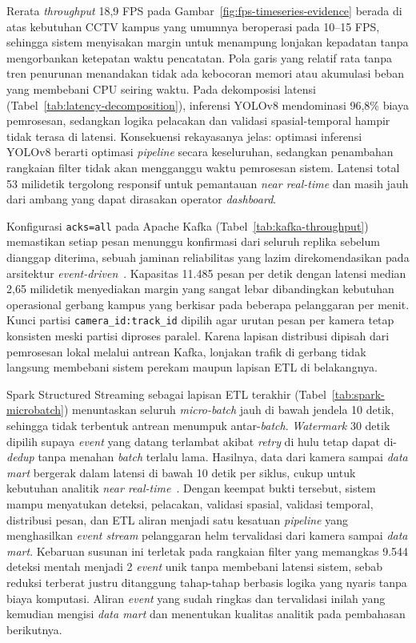 Rerata \textit{throughput} 18,9 FPS pada Gambar~\ref{fig:fps-timeseries-evidence} berada di atas kebutuhan CCTV kampus yang umumnya beroperasi pada 10--15 FPS, sehingga sistem menyisakan margin untuk menampung lonjakan kepadatan tanpa mengorbankan ketepatan waktu pencatatan. Pola garis yang relatif rata tanpa tren penurunan menandakan tidak ada kebocoran memori atau akumulasi beban yang membebani CPU seiring waktu. Pada dekomposisi latensi (Tabel~\ref{tab:latency-decomposition}), inferensi YOLOv8 mendominasi 96,8\% biaya pemrosesan, sedangkan logika pelacakan dan validasi spasial-temporal hampir tidak terasa di latensi. Konsekuensi rekayasanya jelas: optimasi inferensi YOLOv8 berarti optimasi \textit{pipeline} secara keseluruhan, sedangkan penambahan rangkaian filter tidak akan mengganggu waktu pemrosesan sistem. Latensi total 53 milidetik tergolong responsif untuk pemantauan \textit{near real-time} dan masih jauh dari ambang yang dapat dirasakan operator \textit{dashboard}.

Konfigurasi \texttt{acks=all} pada Apache Kafka (Tabel~\ref{tab:kafka-throughput}) memastikan setiap pesan menunggu konfirmasi dari seluruh replika sebelum dianggap diterima, sebuah jaminan reliabilitas yang lazim direkomendasikan pada arsitektur \textit{event-driven}~\cite{kleppmann2017designing}. Kapasitas 11.485 pesan per detik dengan latensi median 2,65 milidetik menyediakan margin yang sangat lebar dibandingkan kebutuhan operasional gerbang kampus yang berkisar pada beberapa pelanggaran per menit. Kunci partisi \texttt{camera\_id:track\_id} dipilih agar urutan pesan per kamera tetap konsisten meski partisi diproses paralel. Karena lapisan distribusi dipisah dari pemrosesan lokal melalui antrean Kafka, lonjakan trafik di gerbang tidak langsung membebani sistem perekam maupun lapisan ETL di belakangnya.

Spark Structured Streaming sebagai lapisan ETL terakhir (Tabel~\ref{tab:spark-microbatch}) menuntaskan seluruh \textit{micro-batch} jauh di bawah jendela 10 detik, sehingga tidak terbentuk antrean menumpuk antar-\textit{batch}. \textit{Watermark} 30 detik dipilih supaya \textit{event} yang datang terlambat akibat \textit{retry} di hulu tetap dapat di-\textit{dedup} tanpa menahan \textit{batch} terlalu lama. Hasilnya, data dari kamera sampai \textit{data mart} bergerak dalam latensi di bawah 10 detik per siklus, cukup untuk kebutuhan analitik \textit{near real-time}~\cite{zaharia2018structured}. Dengan keempat bukti tersebut, sistem mampu menyatukan deteksi, pelacakan, validasi spasial, validasi temporal, distribusi pesan, dan ETL aliran menjadi satu kesatuan \textit{pipeline} yang menghasilkan \textit{event stream} pelanggaran helm tervalidasi dari kamera sampai \textit{data mart}. Kebaruan susunan ini terletak pada rangkaian filter yang memangkas 9.544 deteksi mentah menjadi 2 \textit{event} unik tanpa membebani latensi sistem, sebab reduksi terberat justru ditanggung tahap-tahap berbasis logika yang nyaris tanpa biaya komputasi. Aliran \textit{event} yang sudah ringkas dan tervalidasi inilah yang kemudian mengisi \textit{data mart} dan menentukan kualitas analitik pada pembahasan berikutnya.

